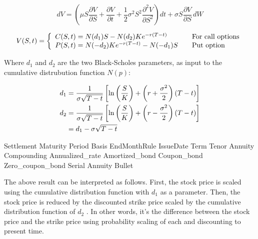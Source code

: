 \documentclass[11pt,a4paper]{article}
\numberwithin{equation}{section}
\begin{document}
\[
dV = \left(\mu S \frac{\partial V}{\partial S} + \frac{\partial V}{\partial t} + \frac{1}{2}\sigma^2 S^2 \frac{\partial^2 V}{\partial S^2}\right)dt + \sigma S \frac{\partial V}{\partial S}\,dW
\]

\[ V(S,t) = \left\{
  \begin{array}{l l}
    C(S,t) = N(d_1)S-N(d_2)Ke^{-r(T-t)} & \quad \text{For call options} \\
    P(S,t) = N(-d_2)Ke^{-r(T-t)}-N(-d_1)S & \quad \text{Put option}
  \end{array} \right.\]

Where $d_1$ and $d_2$ are the two Black-Scholes parameters, as input to the cumulative distrubution function $N(p)$:

\begin{align} 
     d_1 &= \frac{1}{\sigma\sqrt{T - t}}\left[\ln\left(\frac{S}{K}\right) + \left(r + \frac{\sigma^2}{2}\right)(T - t)\right] \notag\\
     d_2 &= \frac{1}{\sigma\sqrt{T - t}}\left[\ln\left(\frac{S}{K}\right) + \left(r - \frac{\sigma^2}{2}\right)(T - t)\right] \notag\\
         &= d_1 - \sigma\sqrt{T - t} \notag
\end{align}

\gls{Settlement}
\gls{Maturity}
\gls{Period}
\gls{Basis}
\gls{EndMonthRule}
\gls{IssueDate}
\gls{Term}
\gls{Tenor}
\gls{Annuity}
\gls{Compounding}
\gls{Annualized_rate}
\gls{Amortized_bond}
\gls{Coupon_bond}
\gls{Zero_coupon_bond}
\gls{Serial}
\gls{Annuity}
\gls{Bullet}

The above result can be interpreted as follows. First, the stock price is
scaled using the cumulative distribution function with $d_1$ as a parameter.
Then, the stock price is reduced by the discounted strike price scaled by the cumulative
distribution function of $d_2$ . In other words, it's the difference between the stock price
and the strike price using probability scaling of each and discounting to present time.

\newpage
\printglossary[title=Terms and abbreviations,toctitle=Terms and abbreviations]

\newpage



\newpage
\printindex
\end{document}
